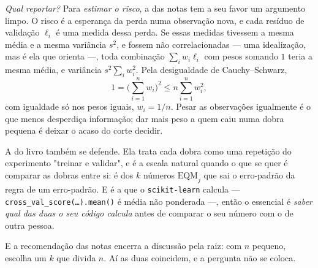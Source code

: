 \begin{solucao}
\emph{Qual reportar?} Para \emph{estimar o risco}, a das notas tem a seu favor um
argumento limpo. O risco é a esperança da perda numa observação nova, e cada resíduo de
validação $\ell_i$ é uma medida dessa perda. Se essas medidas tivessem a mesma média e a
mesma variância $s^2$, e fossem não correlacionadas --- uma idealização, mas é ela que
orienta ---, toda combinação $\sum_iw_i\ell_i$ com pesos somando $1$ teria a mesma
média, e variância $s^2\sum_iw_i^2$. Pela desigualdade de Cauchy--Schwarz,
\[
  1=\Big(\sum_{i=1}^n w_i\Big)^2\le n\sum_{i=1}^n w_i^2 ,
\]
com igualdade só nos pesos iguais, $w_i=1/n$. Pesar as observações igualmente é o que
menos desperdiça informação; dar mais peso a quem caiu numa dobra pequena é deixar o
acaso do corte decidir.

A do livro também se defende. Ela trata cada dobra como uma repetição do experimento
"treinar e validar", e é a escala natural quando o que se quer é comparar as dobras
entre si: é dos $k$ números $\mathrm{EQM}_j$ que sai o erro-padrão da regra de um
erro-padrão. E é a que o \texttt{scikit-learn} calcula ---
\texttt{cross\_val\_score(\dots).mean()} é média não ponderada ---, então o essencial é
\emph{saber qual das duas o seu código calcula} antes de comparar o seu número com o de
outra pessoa.

E a recomendação das notas encerra a discussão pela raiz: com $n$ pequeno, escolha um
$k$ que divida $n$. Aí as duas coincidem, e a pergunta não se coloca.
\end{solucao}
